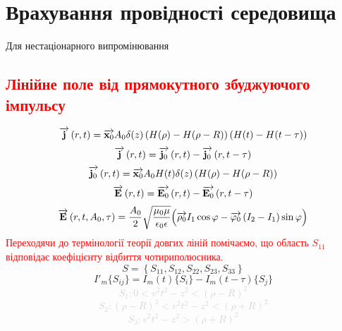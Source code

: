 \section{Врахування провідності середовища}

Для нестаціонарного випромінювання

\textcolor{red} {\section{Лінійне поле від прямокутного збуджуючого імпульсу}}
%
\begin{equation}
\overrightarrow{\mathbf j} \left( r, t \right) = \overrightarrow{\mathbf x_0} A_0 \delta(z) 
\left(  H(\rho) - H(\rho - R) \right) \left( H(t) - H(t-\tau) \right)
\end{equation}
%
\begin{equation}
\overrightarrow{\mathbf j} \left( r, t \right) = \overrightarrow{\mathbf j_0} \left( r, t \right) -
\overrightarrow{\mathbf j_0} \left( r, t - \tau \right)
\end{equation}
%
\textcolor{lightgray} { \begin{equation*}
\overrightarrow{\mathbf j_0} \left( r, t \right) = \overrightarrow{\mathbf x_0} A_0 H(t) \delta(z) 
\left(  H(\rho) - H(\rho - R) \right)
\end{equation*} }
%
\begin{equation}
\overrightarrow{\mathbf E} \left( r, t \right) = \overrightarrow{\mathbf E_0} \left( r, t \right) -
\overrightarrow{\mathbf E_0} \left( r, t - \tau \right)
\end{equation}
%
\begin{equation}
\overrightarrow{\mathbf E} \left( r, t, A_0, \tau \right) = \frac{A_0}{2} 
\sqrt{\frac{\mu_0 \mu}{\epsilon_0 \epsilon}}
\Big( \overrightarrow{\mathbf \rho_0} I_1 \cos \varphi - 
\overrightarrow{\mathbf \varphi_0} \left( I_2 - I_1 \right) \sin \varphi \Big)
\end{equation}
%
\textcolor{red} { Переходячи до термінології теорії довгих ліній помічаємо, 
що область $ S_{11} $ відповідає коефіцієнту відбиття чотириполюсника.}
%
\begin{equation}
S = \left\{ S_{11}, S_{12}, S_{22}, S_{23}, S_{33} \right\}
\end{equation}
%
\begin{equation}
I'_m \{S_{ij}\} = I_m (t) \{S_i\} - I_m (t-\tau) \{S_j\}
\end{equation}
%
\textcolor{lightgray} { \begin{equation*}
S_1: 0 < v^2 t^2 - z^2 < \left( \rho - R \right)^2
\end{equation*}
%
\begin{equation*}
S_2: \left( \rho - R \right)^2 < v^2 t^2 - z^2 < \left( \rho + R \right)^2
\end{equation*}
%
\begin{equation*}
S_3: v^2 t^2 - z^2 > \left( \rho + R \right)^2
\end{equation*} }
